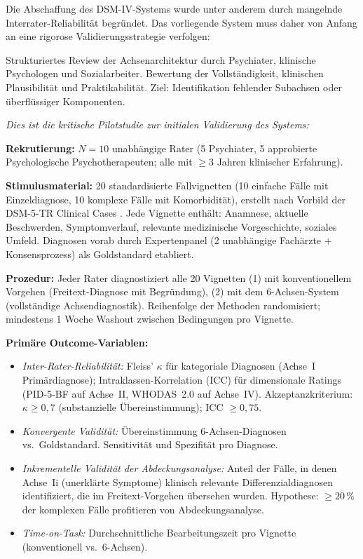 \documentclass[11pt,a4paper]{article}
\begin{document}
Die Abschaffung des DSM-IV-Systems wurde unter anderem durch mangelnde Interrater-Reliabilit\"at begr\"undet. Das vorliegende System muss daher von Anfang an eine rigorose Validierungsstrategie verfolgen:

\begin{description}[style=nextline, leftmargin=1.5cm, font=\bfseries]
\item[Phase~1: Experten-Review (N=10--15)] Strukturiertes Review der Achsenarchitektur durch Psychiater, klinische Psychologen und Sozialarbeiter. Bewertung der Vollst\"andigkeit, klinischen Plausibilit\"at und Praktikabilit\"at. Ziel: Identifikation fehlender Subachsen oder \"uberfl\"ussiger Komponenten.

\item[Phase~2: Inter-Rater-Reliabilitätsstudie mit Fallvignetten (N=10 Rater, 20 Vignetten)] \textit{Dies ist die kritische Pilotstudie zur initialen Validierung des Systems:}

\textbf{Rekrutierung:} $N = 10$ unabh\"angige Rater (5 Psychiater, 5 approbierte Psychologische Psychotherapeuten; alle mit $\geq 3$ Jahren klinischer Erfahrung).

\textbf{Stimulusmaterial:} 20 standardisierte Fallvignetten (10 einfache F\"alle mit Einzeldiagnose, 10 komplexe F\"alle mit Komorbidit\"at), erstellt nach Vorbild der DSM-5-TR Clinical Cases \citep{BarnhillDSM5ClinicalCases}. Jede Vignette enth\"alt: Anamnese, aktuelle Beschwerden, Symptomverlauf, relevante medizinische Vorgeschichte, soziales Umfeld. Diagnosen vorab durch Expertenpanel (2 unabh\"angige Fach\"arzte + Konsensprozess) als Goldstandard etabliert.

\textbf{Prozedur:} Jeder Rater diagnostiziert alle 20 Vignetten (1) mit konventionellem Vorgehen (Freitext-Diagnose mit Begr\"undung), (2) mit dem 6-Achsen-System (vollst\"andige Achsendiagnostik). Reihenfolge der Methoden randomisiert; mindestens 1 Woche Washout zwischen Bedingungen pro Vignette.

\textbf{Prim\"are Outcome-Variablen:}
\begin{itemize}[leftmargin=*, noitemsep]
    \item \textit{Inter-Rater-Reliabilit\"at:} Fleiss' $\kappa$ f\"ur kategoriale Diagnosen (Achse~I Primärdiagnose); Intraklassen-Korrelation (ICC) f\"ur dimensionale Ratings (PID-5-BF auf Achse~II, WHODAS~2.0 auf Achse~IV). Akzeptanzkriterium: $\kappa \geq 0{,}7$ (substanzielle \"Ubereinstimmung); ICC $\geq 0{,}75$.
    \item \textit{Konvergente Validit\"at:} \"Ubereinstimmung 6-Achsen-Diagnosen vs.\ Goldstandard. Sensitivit\"at und Spezifit\"at pro Diagnose.
    \item \textit{Inkrementelle Validit\"at der Abdeckungsanalyse:} Anteil der F\"alle, in denen Achse~Ii (unerkl\"arte Symptome) klinisch relevante Differenzialdiagnosen identifiziert, die im Freitext-Vorgehen \"ubersehen wurden. Hypothese: $\geq 20$\,\% der komplexen F\"alle profitieren von Abdeckungsanalyse.
    \item \textit{Time-on-Task:} Durchschnittliche Bearbeitungszeit pro Vignette (konventionell vs.\ 6-Achsen).
\end{itemize}


\end{description}
\end{document}
